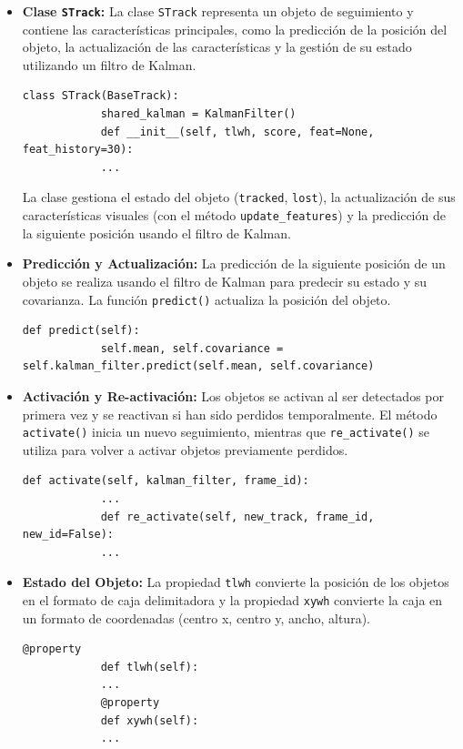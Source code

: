 \documentclass[12pt, a4paper, twoside]{article}
\begin{document}
	\begin{itemize}
		\item \textbf{Clase \texttt{STrack}:}  
		La clase \texttt{STrack} representa un objeto de seguimiento y contiene las características principales, como la predicción de la posición del objeto, la actualización de las características y la gestión de su estado utilizando un filtro de Kalman.
		\begin{lstlisting}[style=pythonstyle]
			class STrack(BaseTrack):
			shared_kalman = KalmanFilter()
			def __init__(self, tlwh, score, feat=None, feat_history=30):
			...
		\end{lstlisting}
		
		La clase gestiona el estado del objeto (\texttt{tracked}, \texttt{lost}), la actualización de sus características visuales (con el método \texttt{update\_features}) y la predicción de la siguiente posición usando el filtro de Kalman.
		
		\item \textbf{Predicción y Actualización:}  
		La predicción de la siguiente posición de un objeto se realiza usando el filtro de Kalman para predecir su estado y su covarianza. La función \texttt{predict()} actualiza la posición del objeto.
		\begin{lstlisting}[style=pythonstyle]
			def predict(self):
			self.mean, self.covariance = self.kalman_filter.predict(self.mean, self.covariance)
		\end{lstlisting}
		
		\item \textbf{Activación y Re-activación:}  
		Los objetos se activan al ser detectados por primera vez y se reactivan si han sido perdidos temporalmente. El método \texttt{activate()} inicia un nuevo seguimiento, mientras que \texttt{re\_activate()} se utiliza para volver a activar objetos previamente perdidos.
		\begin{lstlisting}[style=pythonstyle]
			def activate(self, kalman_filter, frame_id):
			...
			def re_activate(self, new_track, frame_id, new_id=False):
			...
		\end{lstlisting}
		
		\item \textbf{Estado del Objeto:}  
		La propiedad \texttt{tlwh} convierte la posición de los objetos en el formato de caja delimitadora y la propiedad \texttt{xywh} convierte la caja en un formato de coordenadas (centro x, centro y, ancho, altura).
		\begin{lstlisting}[style=pythonstyle]
			@property
			def tlwh(self):
			...
			@property
			def xywh(self):
			...
		\end{lstlisting}
		

\end{itemize}
\end{document}

